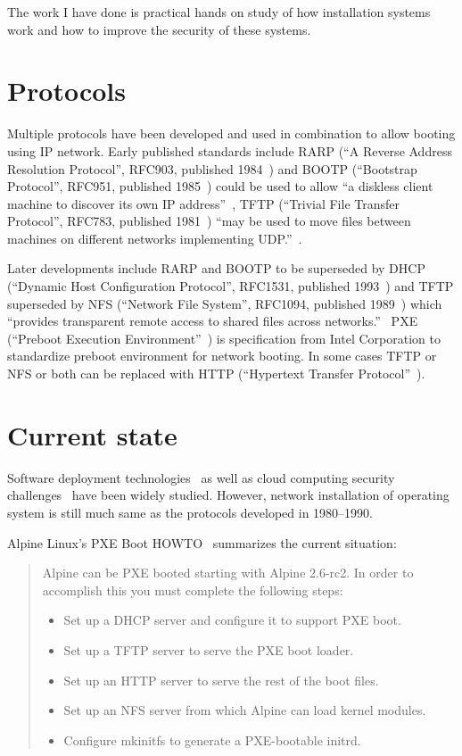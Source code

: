 The work I have done is practical hands on study of how installation
systems work and how to improve the security of these systems.

\section{Protocols}

Multiple protocols have been developed and used in combination to
allow booting using IP network. Early published standards include RARP
(``A Reverse Address Resolution Protocol'', RFC903, published
1984~\cite{RFC903}) and BOOTP (``Bootstrap Protocol'', RFC951,
published 1985~\cite{RFC951}) could be used to allow ``a diskless
client machine to discover its own IP address''~\cite{RFC951}, TFTP
(``Trivial File Transfer Protocol'', RFC783, published
1981~\cite{RFC783}) ``may be used to move files between machines on
different networks implementing UDP.''~\cite{RFC783}.

Later developments include RARP and BOOTP to be superseded by DHCP
(``Dynamic Host Configuration Protocol'', RFC1531, published
1993~\cite{RFC1531}) and TFTP superseded by NFS (``Network File
System'', RFC1094, published 1989~\cite{RFC1094}) which ``provides
transparent remote access to shared files across
networks.''~\cite{RFC1094} PXE (``Preboot Execution
Environment''~\cite{PXEspec}) is specification from Intel Corporation
to standardize preboot environment for network booting. In some cases
TFTP or NFS or both can be replaced with HTTP (``Hypertext Transfer
Protocol''~\cite{RFC1945}\cite{RFC2616}).

\section{Current state}

Software deployment technologies~\cite{SoftDep} as well as cloud
computing security challenges~\cite{Hashizume2013} have been widely
studied. However, network installation of operating system is still
much same as the protocols developed in 1980--1990.

Alpine Linux's PXE Boot HOWTO~\cite{alpine-pxe-boot-howto} summarizes
the current situation:

\begin{quote}
Alpine can be PXE booted starting with Alpine 2.6-rc2. In order to
accomplish this you must complete the following steps:

\begin{itemize}
\item Set up a DHCP server and configure it to support PXE boot.
\item Set up a TFTP server to serve the PXE boot loader.
\item Set up an HTTP server to serve the rest of the boot files.
\item Set up an NFS server from which Alpine can load kernel modules.
\item Configure mkinitfs to generate a PXE-bootable initrd.
\end{itemize}
\end{quote}

